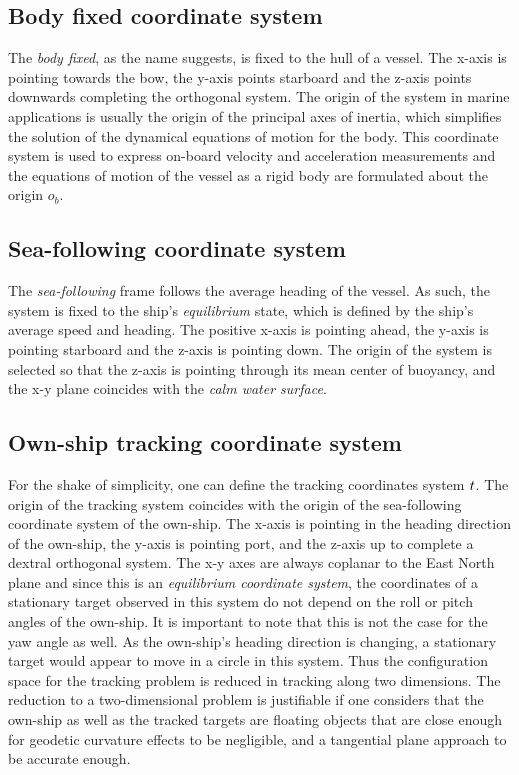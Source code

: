 \subsection{Body fixed coordinate system}


The \emph{body fixed}, as the name suggests, is fixed to the hull of a vessel. The x-axis is pointing towards the bow, the y-axis points starboard and the z-axis points downwards completing the orthogonal system. The origin of the system in marine applications is usually the origin of the principal axes of inertia, which simplifies the solution of the dynamical equations of motion for the body. This coordinate system is used to express on-board velocity and acceleration measurements and the equations of motion of the vessel as a rigid body are formulated about the origin $o_{b}$.

\subsection{Sea-following coordinate system}


The \emph{sea-following} frame follows the average heading of the vessel. As such, the system is fixed to the ship's \emph{equilibrium} state, which is defined by the ship's average speed and heading. The positive x-axis is pointing ahead, the y-axis is pointing starboard and the z-axis is pointing down. The origin of the system is selected so that the z-axis is pointing through its mean center of buoyancy, and the x-y plane coincides with the \emph{calm water surface}.

\subsection{Own-ship tracking coordinate system}


For the shake of simplicity, one can define the tracking coordinates system $\\{t\\}$. The origin of the tracking system coincides with the origin of the sea-following coordinate system of the own-ship. The x-axis is pointing in the heading direction of the own-ship, the y-axis is pointing port, and the z-axis up to complete a dextral orthogonal system. The x-y axes are always coplanar to the East North plane and since this is an \emph{equilibrium coordinate system}, the coordinates of a stationary target observed in this system do not depend on the roll or pitch angles of the own-ship. It is important to note that this is not the case for the yaw angle as well. As the own-ship's heading direction is changing, a stationary target would appear to move in a circle in this system. Thus the configuration space for the tracking problem is reduced in tracking along two dimensions. The reduction to a two-dimensional problem is justifiable if one considers that the own-ship as well as the tracked targets are floating objects that are close enough for geodetic curvature effects to be negligible, and a tangential plane approach to be accurate enough.





